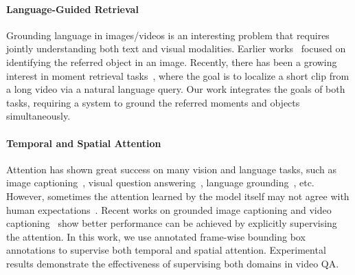 \documentclass[11pt,a4paper]{article}
\begin{document}
\paragraph{Language-Guided Retrieval} 
Grounding language in images/videos is an interesting problem that requires jointly understanding both text and visual modalities. Earlier works~\cite{Kazemzadeh2014ReferItGameRT,yu2017joint,Yu_2018_CVPR,Rohrbach2016GroundingOT} focused on identifying the referred object in an image. 
Recently, there has been a growing interest in moment retrieval tasks~\cite{Hendricks2017LocalizingMI,Hendricks2018LocalizingMI,Gao2017TALLTA}, where the goal is to localize a short clip from a long video via a natural language query. 
Our work integrates the goals of both tasks, requiring a system to ground the referred moments and objects simultaneously.





\paragraph{Temporal and Spatial Attention}
Attention has shown great success on many vision and language tasks, such as image captioning~\cite{Anderson2017BottomUpAT,Xu2015ShowAA}, visual question answering~\cite{Anderson2017BottomUpAT,Trott2018InterpretableCF}, language grounding~\cite{Yu_2018_CVPR}, etc. 
However, sometimes the attention learned by the model itself may not agree with human expectations~\cite{Liu2016AttentionCI,Das2016HumanAI}. 
Recent works on grounded image captioning and video captioning~\cite{Lu2018NeuralBT,Zhou2018GroundedVD} show better performance can be achieved by explicitly supervising the attention. 
In this work, we use annotated frame-wise bounding box annotations to supervise both temporal and spatial attention.
Experimental results demonstrate the effectiveness of supervising both domains in video QA.


\begin{table}[t]
\centering
\small
{}
\caption{Data Statistics for TVQA+ dataset.}
\label{tab:data_stat_main}
\vspace{-5pt}
\end{table}
\end{document}
